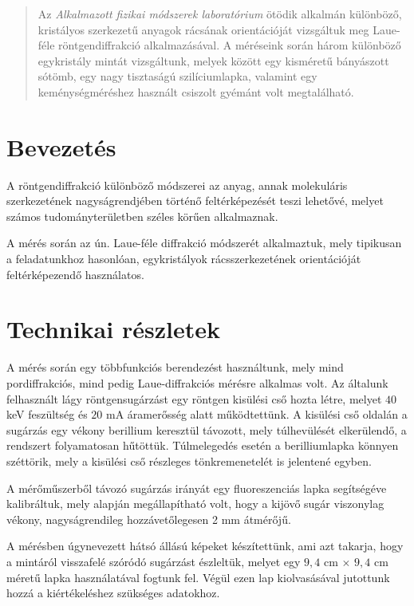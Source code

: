 \begin{abstract}
    \noindent Az \emph{Alkalmazott fizikai módszerek laboratórium} ötödik alkalmán különböző, kristályos szerkezetű anyagok rácsának orientációját vizsgáltuk meg Laue-féle röntgendiffrakció alkalmazásával. A méréseink során három különböző egykristály mintát vizsgáltunk, melyek között egy kisméretű bányászott sótömb, egy nagy tisztaságú szilíciumlapka, valamint egy keménységméréshez használt csiszolt gyémánt volt megtalálható.
\end{abstract}

\begin{multicols}{2}
\section{Bevezetés}
A röntgendiffrakció különböző módszerei az anyag, annak molekuláris szerkezetének nagyságrendjében történő feltérképezését teszi lehetővé, melyet számos tudományterületben széles körűen alkalmaznak. \par
A mérés során az ún. Laue-féle diffrakció módszerét alkalmaztuk, mely tipikusan a feladatunkhoz hasonlóan, egykristályok rácsszerkezetének orientációját feltérképezendő használatos.

\section{Technikai részletek}
A mérés során egy többfunkciós berendezést használtunk, mely mind pordiffrakciós, mind pedig Laue-diffrakciós mérésre alkalmas volt. Az általunk felhasznált lágy röntgensugárzást egy röntgen kisülési cső hozta létre, melyet $40$ keV feszültség és $20$ mA áramerősség alatt működtettünk. A kisülési cső oldalán a sugárzás egy vékony berillium  keresztül távozott, mely túlhevülését elkerülendő, a rendszert folyamatosan hűtöttük. Túlmelegedés esetén a berilliumlapka könnyen széttörik, mely a kisülési cső részleges tönkremenetelét is jelentené egyben. \par
A mérőműszerből távozó sugárzás irányát egy fluoreszenciás lapka segítségéve kalibráltuk, mely alapján megállapítható volt, hogy a kijövő sugár viszonylag vékony, nagyságrendileg hozzávetőlegesen 2 mm átmérőjű. \par
A mérésben úgynevezett hátsó állású képeket készítettünk, ami azt takarja, hogy a mintáról visszafelé szóródó sugárzást észleltük, melyet egy $9,4$ cm $\times$ $9,4$ cm méretű  lapka használatával fogtunk fel. Végül ezen lap kiolvasásával jutottunk hozzá a kiértékeléshez szükséges adatokhoz.


\end{multicols}
